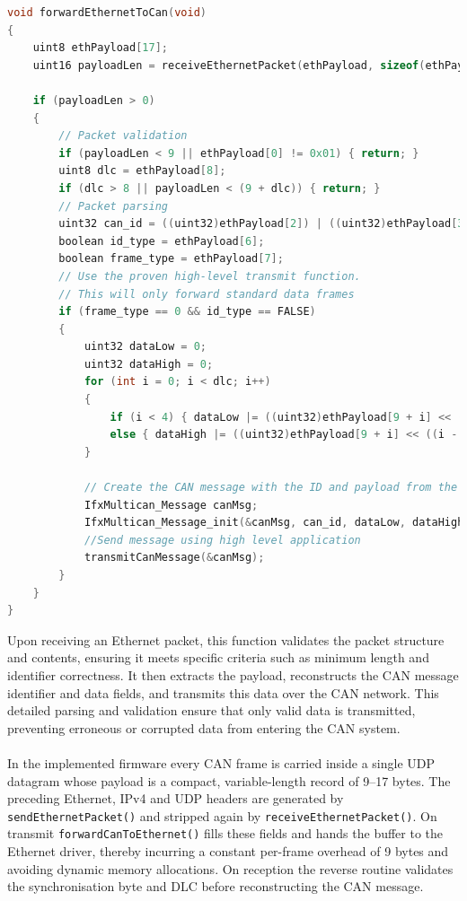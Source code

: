  
\begin{lstlisting}[language=C, caption={Ethernet to CAN message translation (Gateway.c)}, label={lst:eth_to_can}]
void forwardEthernetToCan(void)
{
    uint8 ethPayload[17];
    uint16 payloadLen = receiveEthernetPacket(ethPayload, sizeof(ethPayload));

    if (payloadLen > 0)
    {
        // Packet validation
        if (payloadLen < 9 || ethPayload[0] != 0x01) { return; }
        uint8 dlc = ethPayload[8];
        if (dlc > 8 || payloadLen < (9 + dlc)) { return; }
        // Packet parsing
        uint32 can_id = ((uint32)ethPayload[2]) | ((uint32)ethPayload[3] << 8) | ((uint32)ethPayload[4] << 16) | ((uint32)ethPayload[5] << 24);
        boolean id_type = ethPayload[6];
        boolean frame_type = ethPayload[7];
        // Use the proven high-level transmit function.
        // This will only forward standard data frames
        if (frame_type == 0 && id_type == FALSE)
        {
            uint32 dataLow = 0;
            uint32 dataHigh = 0;
            for (int i = 0; i < dlc; i++)
            {
                if (i < 4) { dataLow |= ((uint32)ethPayload[9 + i] << (i * 8)); }
                else { dataHigh |= ((uint32)ethPayload[9 + i] << ((i - 4) * 8)); }
            }

            // Create the CAN message with the ID and payload from the UDP packet
            IfxMultican_Message canMsg;
            IfxMultican_Message_init(&canMsg, can_id, dataLow, dataHigh, (IfxMultican_DataLengthCode)dlc);
            //Send message using high level application
            transmitCanMessage(&canMsg);
        }
    }
}
\end{lstlisting}
\newpage
\noindent
Upon receiving an Ethernet packet, this function validates the packet structure and contents, ensuring it meets specific criteria such as minimum length and identifier correctness. It then extracts the payload, reconstructs the CAN message identifier and data fields, and transmits this data over the CAN network. This detailed parsing and validation ensure that only valid data is transmitted, preventing erroneous or corrupted data from entering the CAN system.\\\\
In the implemented firmware every CAN frame is carried inside a single UDP datagram whose payload is a compact, variable-length record of 9–17 bytes. The preceding Ethernet, IPv4 and UDP headers are generated by \verb|sendEthernetPacket()| and stripped again by \verb|receiveEthernetPacket()|. On transmit \verb|forwardCanToEthernet()| fills these fields and hands the buffer to the Ethernet driver, thereby incurring a constant per-frame overhead of 9 bytes and avoiding dynamic memory allocations. On reception the reverse routine validates the synchronisation byte and DLC before reconstructing the CAN message. \\\\
